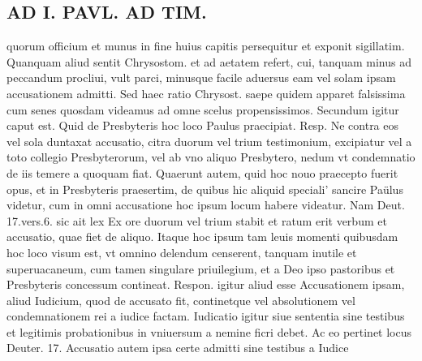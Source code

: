 \documentclass{article}
\begin{document}
\begin{pages}
\section*{AD I. PAVL. AD TIM. }
\marginpar{[ p.51 ]}\pstart quorum officium et munus in fine huius capitis persequitur et exponit sigillatim. Quanquam aliud sentit Chrysostom. et ad aetatem refert, cui, tanquam minus ad peccandum procliui, vult parci, minusque facile aduersus eam vel solam ipsam accusationem admitti. Sed haec ratio Chrysost. saepe quidem apparet falsissima cum senes quosdam videamus ad omne scelus propensissimos. Secundum igitur caput est. Quid de Presbyteris hoc loco Paulus praecipiat. Resp. Ne contra eos vel sola duntaxat accusatio, citra duorum vel trium testimonium, excipiatur vel a toto collegio Presbyterorum, vel ab vno aliquo Presbytero, nedum vt condemnatio de iis temere a quoquam fiat. Quaerunt autem, quid hoc nouo praecepto fuerit opus, et in Presbyteris praesertim, de quibus hic aliquid speciali' sancire Paülus videtur, cum in omni accusatione hoc ipsum locum habere videatur. Nam Deut. 17.vers.6. sic ait lex Ex ore duorum vel trium stabit et ratum erit verbum et accusatio, quae fiet de aliquo. Itaque hoc ipsum tam leuis momenti quibusdam hoc loco visum est, vt omnino delendum censerent, tanquam inutile et superuacaneum, cum tamen singulare priuilegium, et a Deo ipso pastoribus et Presbyteris concessum contineat. Respon. igitur aliud esse Accusationem ipsam, aliud Iudicium, quod de accusato fit, continetque vel absolutionem vel condemnationem rei a iudice factam. Iudicatio igitur siue sententia sine testibus et legitimis probationibus in vniuersum a nemine ficri debet. Ac eo pertinet locus Deuter. 17. Accusatio autem ipsa certe admitti sine testibus a Iudice  \pend

\end{pages}
\end{document}
